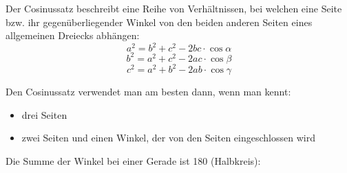 Der Cosinussatz beschreibt eine Reihe von Verh\"{a}ltnissen, bei welchen eine Seite bzw. ihr gegen\"{u}berliegender Winkel von den beiden anderen Seiten eines allgemeinen Dreiecks abh\"{a}ngen: $$a^2 = b^2 + c^2 - 2bc \cdot \cos \alpha$$ $$b^2 = a^2 + c^2 - 2ac \cdot \cos \beta$$ $$c^2 = a^2 + b^2 - 2ab \cdot \cos \gamma$$

Den Cosinussatz verwendet man am besten dann, wenn man kennt:
\begin{itemize}
	\item drei Seiten
	\item zwei Seiten und einen Winkel, der von den Seiten eingeschlossen wird
\end{itemize}

\begin{figure}[h!]
\end{figure}


Die Summe der Winkel bei einer Gerade ist 180 (Halbkreis):

